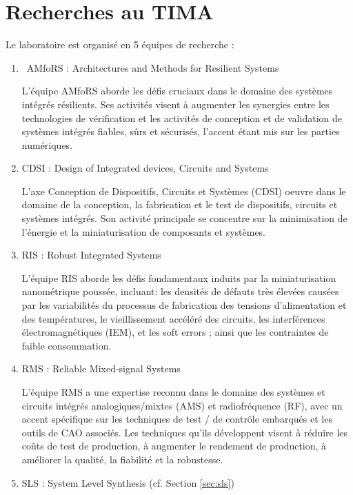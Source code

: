 \section{Recherches au TIMA}
Le laboratoire est organisé en 5 équipes de recherche :

\begin{enumerate}
\item\ AMfoRS : Architectures and Methods for Resilient Systems

L'équipe AMfoRS aborde les défis cruciaux dans le domaine des systèmes intégrés résilients.
Ses activités visent à augmenter les synergies entre les technologies de vérification 
et les activités de conception et de validation de systèmes intégrés fiables, sûrs et sécurisés, l'accent étant mis sur les parties numériques.

\item

CDSI : Design of Integrated devices, Circuits and Systems

L'axe Conception de Dispositifs, Circuits et Systèmes (CDSI) oeuvre dans le domaine de la conception, 
la fabrication et le test de dispositifs, circuits et systèmes intégrés. 
Son activité principale se concentre sur la minimisation de l'énergie et la miniaturisation de composants et systèmes.

\item
	
RIS : Robust Integrated Systems

L'équipe RIS aborde les défis fondamentaux induits par la miniaturisation nanométrique poussée, 
incluant: les densités de défauts très élevées causées par les variabilités 
du processus de fabrication des tensions d’alimentation et des températures, le vieillissement accéléré des circuits, 
les interférences électromagnétiques (IEM), et les soft errors ; ainsi que les contraintes de faible consommation.

\item

RMS : Reliable Mixed-signal Systems

L'équipe RMS a une expertise reconnu dans le domaine des systèmes et circuits intégrés analogiques/mixtes (AMS) 
et radiofréquence (RF), avec un accent spécifique sur les techniques de test / de contrôle embarqués et les outils de CAO associés.
Les techniques qu'ils développent visent à réduire les coûts de test de production, 
à augmenter le rendement de production, à améliorer la qualité, la fiabilité et la robustesse.

\item

SLS : System Level Synthesis (cf. Section \ref{sec:sls})

\end{enumerate}


